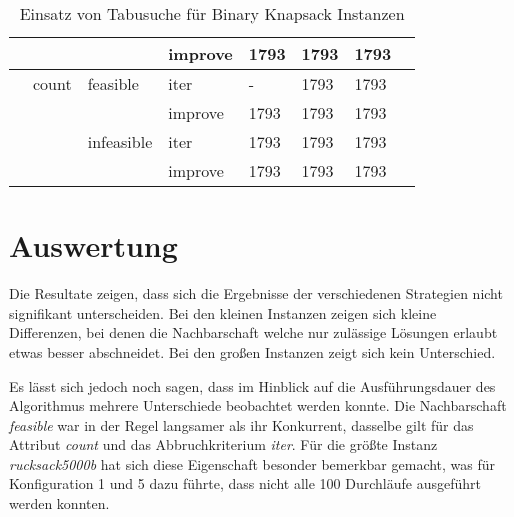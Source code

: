 \documentclass[11pt,a4paper]{article}
\begin{document}
\begin{table}[!t]
\begin{tabular}{ | l | l | l | l | l | l | l | l | }
                      &       &            & improve & 1793 & 1793 & 1793 \\ \hline
                      & count & feasible   & iter    & - & 1793 & 1793 \\ \hline
                      &       &            & improve & 1793 & 1793 & 1793 \\ \hline
                      &       & infeasible & iter    & 1793 & 1793 & 1793 \\ \hline
                      &       &            & improve & 1793 & 1793 & 1793 \\ \hline
  \end{tabular}
    \caption{Einsatz von Tabusuche für Binary Knapsack Instanzen}
    \label{tab:results}
\end{table}

\clearpage

\section{Auswertung}

Die Resultate zeigen, dass sich die Ergebnisse der verschiedenen Strategien nicht signifikant unterscheiden. Bei den kleinen Instanzen zeigen sich kleine Differenzen, bei denen die Nachbarschaft welche nur zulässige Lösungen erlaubt etwas besser abschneidet. Bei den großen Instanzen zeigt sich kein Unterschied.

Es lässt sich jedoch noch sagen, dass im Hinblick auf die Ausführungsdauer des Algorithmus mehrere Unterschiede beobachtet werden konnte. Die Nachbarschaft \textit{feasible} war in der Regel langsamer als ihr Konkurrent, dasselbe gilt für das Attribut \textit{count} und das Abbruchkriterium \textit{iter}. Für die größte Instanz \textit{rucksack5000b} hat sich diese Eigenschaft besonder bemerkbar gemacht, was für Konfiguration 1 und 5 dazu führte, dass nicht alle 100 Durchläufe ausgeführt werden konnten.
\end{document}
